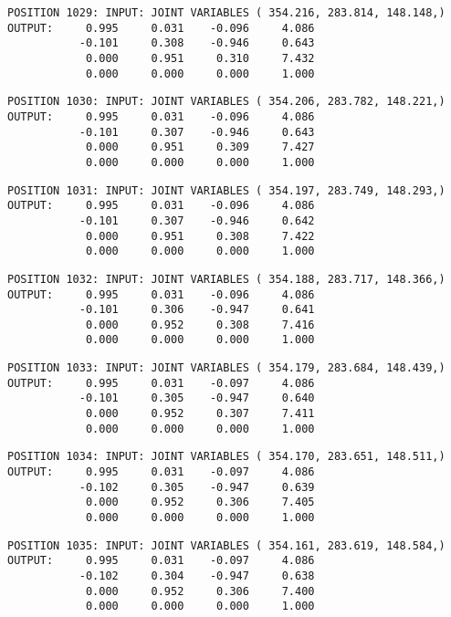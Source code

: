 \begin{verbatim}
POSITION 1029: INPUT: JOINT VARIABLES ( 354.216, 283.814, 148.148,)
OUTPUT:     0.995     0.031    -0.096     4.086
           -0.101     0.308    -0.946     0.643
            0.000     0.951     0.310     7.432
            0.000     0.000     0.000     1.000
\end{verbatim} \pagebreak[1]\begin{verbatim}
POSITION 1030: INPUT: JOINT VARIABLES ( 354.206, 283.782, 148.221,)
OUTPUT:     0.995     0.031    -0.096     4.086
           -0.101     0.307    -0.946     0.643
            0.000     0.951     0.309     7.427
            0.000     0.000     0.000     1.000
\end{verbatim} \pagebreak[1]\begin{verbatim}
POSITION 1031: INPUT: JOINT VARIABLES ( 354.197, 283.749, 148.293,)
OUTPUT:     0.995     0.031    -0.096     4.086
           -0.101     0.307    -0.946     0.642
            0.000     0.951     0.308     7.422
            0.000     0.000     0.000     1.000
\end{verbatim} \pagebreak[1]\begin{verbatim}
POSITION 1032: INPUT: JOINT VARIABLES ( 354.188, 283.717, 148.366,)
OUTPUT:     0.995     0.031    -0.096     4.086
           -0.101     0.306    -0.947     0.641
            0.000     0.952     0.308     7.416
            0.000     0.000     0.000     1.000
\end{verbatim} \pagebreak[1]\begin{verbatim}
POSITION 1033: INPUT: JOINT VARIABLES ( 354.179, 283.684, 148.439,)
OUTPUT:     0.995     0.031    -0.097     4.086
           -0.101     0.305    -0.947     0.640
            0.000     0.952     0.307     7.411
            0.000     0.000     0.000     1.000
\end{verbatim} \pagebreak[1]\begin{verbatim}
POSITION 1034: INPUT: JOINT VARIABLES ( 354.170, 283.651, 148.511,)
OUTPUT:     0.995     0.031    -0.097     4.086
           -0.102     0.305    -0.947     0.639
            0.000     0.952     0.306     7.405
            0.000     0.000     0.000     1.000
\end{verbatim} \pagebreak[1]\begin{verbatim}
POSITION 1035: INPUT: JOINT VARIABLES ( 354.161, 283.619, 148.584,)
OUTPUT:     0.995     0.031    -0.097     4.086
           -0.102     0.304    -0.947     0.638
            0.000     0.952     0.306     7.400
            0.000     0.000     0.000     1.000
\end{verbatim} \pagebreak[1]\begin{verbatim}

\end{verbatim}
